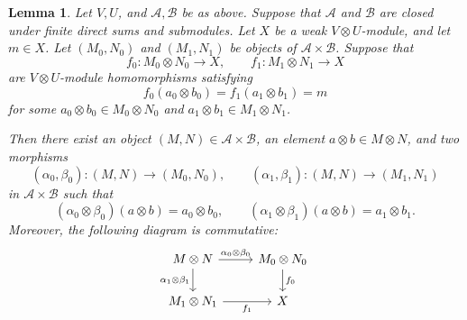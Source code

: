 \documentclass[12pt, english]{article}
\numberwithin{equation}{section}
\theoremstyle{plain}
\newtheorem{lemma}{Lemma}[section]
\theoremstyle{definition}
\theoremstyle{remark}
\begin{document}
	\begin{lemma} \label{lem:common-presentation-refinement}
		Let $V, U$, and $\mathcal{A}, \mathcal{B}$ be as above.
		Suppose that $\mathcal{A}$ and $\mathcal{B}$ are closed under finite direct sums and submodules.
		Let $X$ be a weak $V \otimes U$-module, and let $m \in X$.
		Let $(M_0, N_0)$ and $(M_1, N_1)$ be objects of $ \mathcal{A} \times \mathcal{B}$. Suppose that
		\[
		f_0 \colon M_0 \otimes N_0 \longrightarrow X, \qquad f_1 \colon M_1 \otimes N_1 \longrightarrow X
		\]
		are $V \otimes U$-module homomorphisms satisfying
		\[
		f_0(a_0 \otimes b_0) = f_1(a_1 \otimes b_1) = m
		\]
		for some $a_0 \otimes b_0 \in M_0 \otimes N_0$ and $a_1 \otimes b_1 \in M_1 \otimes N_1$.
		
		Then there exist an object $(M, N) \in \mathcal{A} \times \mathcal{B} $, an element $a \otimes b \in M \otimes N$,
		and two morphisms
		\[
		(\alpha_0, \beta_0) \colon (M, N) \longrightarrow (M_0, N_0), \qquad
		(\alpha_1, \beta_1) \colon (M, N) \longrightarrow (M_1, N_1)
		\]
		in $\mathcal{A} \times \mathcal{B} $ such that
		\[
		(\alpha_0 \otimes \beta_0) (a \otimes b) = a_0 \otimes b_0, \qquad
		(\alpha_1 \otimes \beta_1) (a \otimes b) = a_1 \otimes b_1.
		\]
		Moreover, the following diagram is commutative:
		\[
		\begin{tikzcd}
			M \otimes N \arrow[r, "\alpha_0 \otimes \beta_0"] \arrow[d, "\alpha_1 \otimes \beta_1"'] & M_0 \otimes N_0 \arrow[d, "f_0"] \\
			M_1 \otimes N_1 \arrow[r, "f_1"'] & X
		\end{tikzcd}
		\]
		
	\end{lemma}
	
\end{document}
